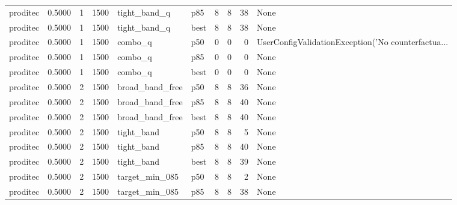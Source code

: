 \begin{tabular}{lrrrllrrrl}
proditec &    0.5000 &    1 &   1500 &         tight\_band\_q &    p85 &               8 &          8 &      38 &                                               None \\
proditec &    0.5000 &    1 &   1500 &         tight\_band\_q &   best &               8 &          8 &      38 &                                               None \\
proditec &    0.5000 &    1 &   1500 &              combo\_q &    p50 &               0 &          0 &       0 & UserConfigValidationException('No counterfactua... \\
proditec &    0.5000 &    1 &   1500 &              combo\_q &    p85 &               0 &          0 &       0 &                                               None \\
proditec &    0.5000 &    1 &   1500 &              combo\_q &   best &               0 &          0 &       0 &                                               None \\
proditec &    0.5000 &    2 &   1500 &      broad\_band\_free &    p50 &               8 &          8 &      36 &                                               None \\
proditec &    0.5000 &    2 &   1500 &      broad\_band\_free &    p85 &               8 &          8 &      40 &                                               None \\
proditec &    0.5000 &    2 &   1500 &      broad\_band\_free &   best &               8 &          8 &      40 &                                               None \\
proditec &    0.5000 &    2 &   1500 &           tight\_band &    p50 &               8 &          8 &       5 &                                               None \\
proditec &    0.5000 &    2 &   1500 &           tight\_band &    p85 &               8 &          8 &      40 &                                               None \\
proditec &    0.5000 &    2 &   1500 &           tight\_band &   best &               8 &          8 &      39 &                                               None \\
proditec &    0.5000 &    2 &   1500 &       target\_min\_085 &    p50 &               8 &          8 &       2 &                                               None \\
proditec &    0.5000 &    2 &   1500 &       target\_min\_085 &    p85 &               8 &          8 &      38 &                                               None \\

\end{tabular}
